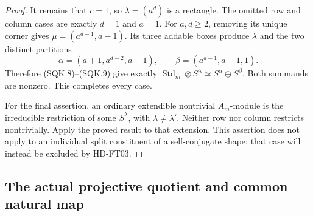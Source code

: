 \begin{proof}
It remains that \(c=1\), so \(\lambda=(a^d)\) is a rectangle.
The omitted row and column cases are exactly \(d=1\) and
\(a=1\).  For \(a,d\ge2\), removing its unique corner gives
\(\mu=(a^{d-1},a-1)\).  Its three addable boxes produce
\(\lambda\) and the two distinct partitions
\[
       \alpha=(a+1,a^{d-2},a-1),\qquad
       \beta=(a^{d-1},a-1,1).
 \tag{SQK.10}
\]
Therefore (SQK.8)--(SQK.9) give exactly
\(\operatorname{Std}_m\otimes S^\lambda
 \simeq S^\alpha\oplus S^\beta\).
Both summands are nonzero.  This completes every case.

For the final assertion, an ordinary extendible nontrivial
\(A_m\)-module is the irreducible restriction of some
\(S^\lambda\), with \(\lambda\ne\lambda'\).  Neither row
nor column restricts nontrivially.  Apply the proved result
to that extension.  This assertion does not apply to an
individual split constituent of a self-conjugate shape;
that case will instead be excluded by HD-FT03.
\end{proof}

\subsection*{The actual projective quotient and common natural map}

